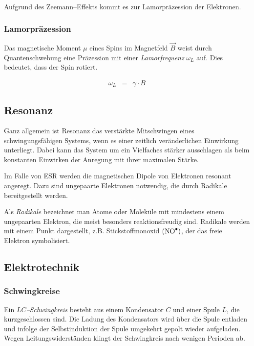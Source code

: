 \documentclass[12pt,a4paper]{scrartcl}
\numberwithin{equation}{section} %
\begin{document}
Aufgrund des Zeemann--Effekts kommt es zur Lamorpräzession der
Elektronen.

\hypertarget{lamorpruxe4zession}{%
\subsubsection{Lamorpräzession}\label{lamorpruxe4zession}}

Das magnetische Moment $\mu$ eines Spins im Magnetfeld $\vec{B}$
weist durch Quantenschwebung eine Präzession mit einer
\emph{Lamorfrequenz} $\omega_L$ auf. Dies bedeutet, dass der Spin
rotiert.

\begin{eqnarray}
    \omega_L &=& \gamma\cdot B
\end{eqnarray}

\hypertarget{resonanz}{%
\subsection{Resonanz}\label{resonanz}}

Ganz allgemein ist Resonanz das verstärkte Mitschwingen eines
schwingungsfähigen Systems, wenn es einer zeitlich veränderlichen
Einwirkung unterliegt. Dabei kann das System um ein Vielfaches stärker
ausschlagen als beim konstanten Einwirken der Anregung mit ihrer
maximalen Stärke.

Im Falle von ESR werden die magnetischen Dipole von Elektronen resonant
angeregt. Dazu sind ungepaarte Elektronen notwendig, die durch Radikale
bereitgestellt werden.

Als \emph{Radikale} bezeichnet man Atome oder Moleküle mit mindestens
einem ungepaarten Elektron, die meist besonders reaktionsfreudig sind.
Radikale werden mit einem Punkt dargestellt, z.B. Stickstoffmonoxid
$(\ce{NO^\bullet})$, der das freie Elektron symbolisiert.
\cite{Radikale}

\hypertarget{elektrotechnik}{%
\subsection{Elektrotechnik}\label{elektrotechnik}}

\hypertarget{schwingkreise}{%
\subsubsection{Schwingkreise}\label{schwingkreise}}

Ein \emph{$LC$--Schwingkreis} besteht aus einem Kondensator $C$ und
einer Spule $L$, die kurzgeschlossen sind. Die Ladung des Kondensators
wird über die Spule entladen und infolge der Selbstinduktion der Spule
umgekehrt gepolt wieder aufgeladen. Wegen Leitungswiderständen klingt
der Schwingkreis nach wenigen Perioden ab.
\end{document}
